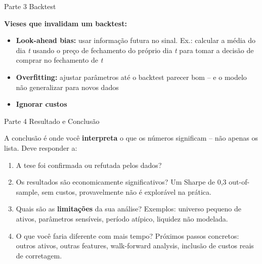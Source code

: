 \documentclass[11pt,a4paper]{article}
\begin{document}
\begin{stepbox}{Parte 3 \quad Backtest}
\begin{warningbox}
  \textbf{Vieses que invalidam um backtest:}
  \begin{itemize}
    \item \textbf{Look-ahead bias:} usar informa\c{c}\~ao futura no sinal.
          Ex.: calcular a m\'edia do dia \emph{t} usando o pre\c{c}o de
          fechamento do pr\'oprio dia \emph{t} para tomar a decis\~ao de
          comprar no fechamento de \emph{t}
    \item \textbf{Overfitting:} ajustar par\^ametros at\'e o backtest parecer
          bom -- e o modelo n\~ao generalizar para novos dados
    \item \textbf{Ignorar custos} 
  \end{itemize}
\end{warningbox}
\end{stepbox}

\vspace{1em}

\begin{stepbox}{Parte 4 \quad Resultado e Conclus\~ao}

A conclus\~ao \'e onde voc\^e \textbf{interpreta} o que os n\'umeros
significam -- n\~ao apenas os lista. Deve responder a:

\begin{enumerate}
  \item A tese foi confirmada ou refutada pelos dados?

  \item Os resultados s\~ao economicamente significativos?
        Um Sharpe de 0,3 out-of-sample, sem custos, provavelmente
        n\~ao \'e explor\'avel na pr\'atica.

  \item Quais s\~ao as \textbf{limita\c{c}\~oes} da sua an\'alise?
        Exemplos: universo pequeno de ativos, par\^ametros sens\'iveis,
        per\'iodo atípico, liquidez n\~ao modelada.

  \item O que voc\^e faria diferente com mais tempo?
        Pr\'oximos passos concretos: outros ativos, outras features,
        walk-forward analysis, inclus\~ao de custos reais de corretagem.
\end{enumerate}
\end{stepbox}

\newpage

\end{document}
